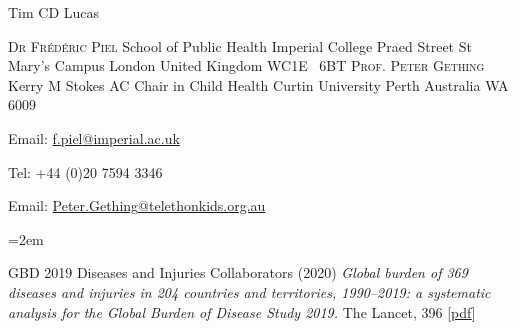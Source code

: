 \documentclass{scrartcl}
\newcommand{\MarginText}[1]{\marginpar{\raggedleft\itshape\small#1}} %
\newcommand{\Description}[1]{\hangindent=2em\hangafter=0\noindent\raggedright\footnotesize{#1}\par\normalsize\vspace{1em}} %
\begin{document}
\begin{cv}{Tim {\Large CD} Lucas}
\begin{multicols}{2}
\begin{footnotesize}
\textsc{Dr Fr\'{e}d\'{e}ric Piel}\newline
School of Public Health\newline
Imperial College\newline
Praed Street\newline
St Mary's Campus 
London\newline
United Kingdom\newline
{\scriptsize WC}1{\scriptsize E} \ 6{\scriptsize BT}
\vfill
\columnbreak
\textsc{Prof. Peter Gething}\newline
Kerry M Stokes AC Chair in Child Health
\newline
Curtin University\newline
Perth\newline
Australia\newline
{\scriptsize WA} 6009


\end{footnotesize}
\end{multicols}
\vspace{-0.5cm}
\begin{multicols}{2}
\begin{footnotesize}

Email: \href{mailto:f.piel@imperial.ac.uk}{f.piel{\scriptsize @}imperial.ac.uk}\newline

Tel: +44 (0)20 7594 3346


\columnbreak
Email: \href{mailto:Peter.Gething@telethonkids.org.au}{Peter.Gething{\scriptsize @}telethonkids.org.au}\newline

\end{footnotesize}
\end{multicols}



\vspace{2em} %


{\color{Maroon}}\vspace{1em}


\Description{\MarginText{2020}GBD 2019 Diseases and Injuries Collaborators (2020) \emph{Global burden of 369 diseases and injuries in 204 countries and territories, 1990–2019: a systematic analysis for the Global Burden of Disease Study 2019.} The Lancet, 396 [\href{https://reader.elsevier.com/reader/sd/pii/S0140673618322256?token=B51BB41EDB592105E398079BFEE0CA91BB2DA80DC879A7B3CFD538DFBF8ADE6FA424858694B94E7860E6AE8461E553E7}{pdf}]}





\end{cv}
\end{document}
